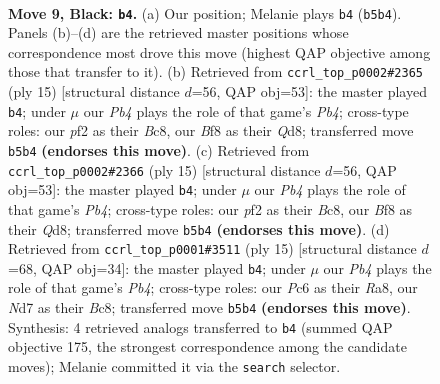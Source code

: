 \documentclass[11pt]{article}
\begin{document}
\clearpage

\begin{figure}[p]\centering
\begin{subfigure}{0.46\textwidth}\centering
\resizebox{\linewidth}{!}{%
\newchessgame
\chessboard[
  setfen={r1bq1b1r/p2nkppp/2p1pn2/1p6/3P4/2N1PN2/PP2BPPP/R1BQ1RK1 b - - 1 9},
  showmover=false,
  pgfstyle=straightmove, color=movearrow, markmove={b5-b4}
]}
\caption{}
\end{subfigure}\hfill
\begin{subfigure}{0.46\textwidth}\centering
\resizebox{\linewidth}{!}{%
\newchessgame
\chessboard[
  setfen={r1bqkb1r/p2n1ppp/2p1pn2/1p6/3P4/2N1PN2/PP2BPPP/R1BQK2R b KQkq - 1 8},
  showmover=false,
  pgfstyle=straightmove, color=movearrow, markmove={b5-b4}
]}
\caption{}
\end{subfigure}
\\[4pt]
\begin{subfigure}{0.46\textwidth}\centering
\resizebox{\linewidth}{!}{%
\newchessgame
\chessboard[
  setfen={r1bqkb1r/p2n1ppp/2p1pn2/1p6/3P4/2N1PN2/PP2BPPP/R1BQK2R b KQkq - 1 8},
  showmover=false,
  pgfstyle=straightmove, color=movearrow, markmove={b5-b4}
]}
\caption{}
\end{subfigure}\hfill
\begin{subfigure}{0.46\textwidth}\centering
\resizebox{\linewidth}{!}{%
\newchessgame
\chessboard[
  setfen={r1bqkb1r/p2n1ppp/2p1pn2/1p6/3P4/1BN1PN2/PP3PPP/R1BQK2R b KQkq - 1 8},
  showmover=false,
  pgfstyle=straightmove, color=movearrow, markmove={b5-b4}
]}
\caption{}
\end{subfigure}
\caption{\textbf{Move 9, Black: \texttt{b4}.} (a) Our position; Melanie plays \texttt{b4} (\texttt{b5b4}). Panels (b)--(d) are the retrieved master positions whose correspondence most drove this move (highest QAP objective among those that transfer to it). (b) Retrieved from \texttt{ccrl\_top\_p0002\#2365} (ply 15) [structural distance $d$=56, QAP obj=53]: the master played \texttt{b4}; under $\mu$ our \emph{Pb4} plays the role of that game's \emph{Pb4}; cross-type roles: our \emph{p}f2 as their \emph{B}c8, our \emph{B}f8 as their \emph{Q}d8; transferred move \texttt{b5b4} \textbf{(endorses this move)}. (c) Retrieved from \texttt{ccrl\_top\_p0002\#2366} (ply 15) [structural distance $d$=56, QAP obj=53]: the master played \texttt{b4}; under $\mu$ our \emph{Pb4} plays the role of that game's \emph{Pb4}; cross-type roles: our \emph{p}f2 as their \emph{B}c8, our \emph{B}f8 as their \emph{Q}d8; transferred move \texttt{b5b4} \textbf{(endorses this move)}. (d) Retrieved from \texttt{ccrl\_top\_p0001\#3511} (ply 15) [structural distance $d$=68, QAP obj=34]: the master played \texttt{b4}; under $\mu$ our \emph{Pb4} plays the role of that game's \emph{Pb4}; cross-type roles: our \emph{P}c6 as their \emph{R}a8, our \emph{N}d7 as their \emph{B}c8; transferred move \texttt{b5b4} \textbf{(endorses this move)}. Synthesis: 4 retrieved analogs transferred to \texttt{b4} (summed QAP objective 175, the strongest correspondence among the candidate moves); Melanie committed it via the \texttt{search} selector.}
\label{fig:thought-m17}
\end{figure}
\end{document}
